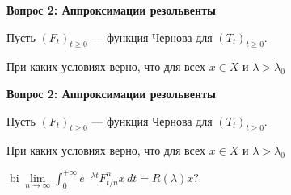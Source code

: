 \documentclass[11pt]{article}
\begin{document}
\newpage

\begin{center}
{\color{notaeYELLOW}\bfseries\fontsize{44}{52}\selectfont Вопрос 2: Аппроксимации резольвенты}
\end{center}
\vspace*{\fill}
\begin{center}
\fontsize{36}{43}\selectfont
\parbox{\linewidth}{\centering\noindent Пусть $(F_t)_{t\ge0}$ --- функция Чернова для $(T_t)_{t\ge0}$.
\par}\vspace{0.4in}
\parbox{\linewidth}{\centering\noindent При каких условиях верно, что для всех $x\in X$ и $\lambda>\lambda_0$
\par}\vspace{0.4in}
\end{center}
\vspace*{\fill}

\newpage

\begin{center}
{\color{notaeYELLOW}\bfseries\fontsize{44}{52}\selectfont Вопрос 2: Аппроксимации резольвенты}
\end{center}
\vspace*{\fill}
\begin{center}
\fontsize{36}{43}\selectfont
\parbox{\linewidth}{\centering\noindent Пусть $(F_t)_{t\ge0}$ --- функция Чернова для $(T_t)_{t\ge0}$.
\par}\vspace{0.4in}
\parbox{\linewidth}{\centering\noindent При каких условиях верно, что для всех $x\in X$ и $\lambda>\lambda_0$
\par}\vspace{0.4in}
\parbox{\linewidth}{\centering\noindent $\operatorname{bi}\lim\limits_{n\to\infty}\int_0^{+\infty}e^{-\lambda t}F_{t/n}^n x\,dt=R(\lambda)x?$
\par}\vspace{0.4in}
\end{center}
\vspace*{\fill}

\newpage
\end{document}
